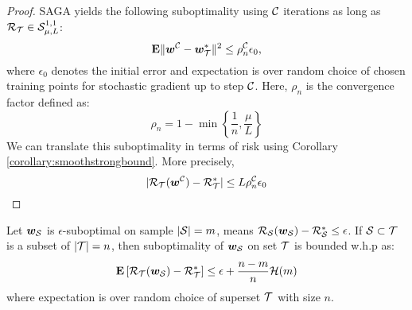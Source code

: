 \begin{proof}
	SAGA yields the following
suboptimality using $\C$ iterations \cite{defazio2014saga} as
long as $\risk_{\T} \in \smoothstrong$:
\begin{equation*}
	\E \| \w^{\C} - \w^*_{\T} \|^2 \leq \rho_{n}^{\C} \epsilon_0,
\end{equation*}
where $\epsilon_0$ denotes the initial error and expectation is over random
choice of chosen training points for stochastic gradient up to step $\C$. Here,
$\rho_{n}$ is the convergence factor defined as:
\begin{equation*}
	\rho_n = 1- \min\left\{ \frac{1}{n}, \frac{\mu}{ L} \right\}
\end{equation*}
We can translate this suboptimality in terms of risk using Corollary
\ref{corollary:smoothstrongbound}. More precisely,
\begin{equation*}
	|\risk_{\T}( \w^{\C}) - \risk^*_{\T}| \leq L \rho_{n}^{\C} \epsilon_0
\end{equation*}
\end{proof}
 \begin{theorem}
 		Let $\w_\S$ is $\epsilon$-suboptimal on sample $|\S| = m$, means 
 		$\risk_\S(\w_\S) - \risk_\S^* \le \epsilon$. 
 		If $\S \subset \T$ is a subset of $|\T| = n$, then suboptimality of $\w_\S$
 		on set $\T$ is bounded w.h.p as: 
 		\begin{align}
			\E \left[ \risk_\T(\w_\S) - \risk_\T^*\right] \le \epsilon +
			\frac{n-m}{n} \bound(m)
		\end{align}
		where expectation is over random choice of superset $\T$ with size $n$. 
 \end{theorem}

